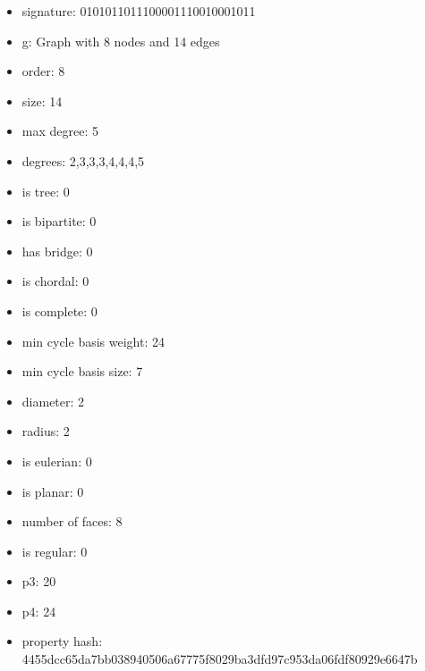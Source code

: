 \begin{itemize}
\item signature: 0101011011100001110010001011
\item g: Graph with 8 nodes and 14 edges
\item order: 8
\item size: 14
\item max degree: 5
\item degrees: 2,3,3,3,4,4,4,5
\item is tree: 0
\item is bipartite: 0
\item has bridge: 0
\item is chordal: 0
\item is complete: 0
\item min cycle basis weight: 24
\item min cycle basis size: 7
\item diameter: 2
\item radius: 2
\item is eulerian: 0
\item is planar: 0
\item number of faces: 8
\item is regular: 0
\item p3: 20
\item p4: 24
\item property hash: 4455dcc65da7bb038940506a67775f8029ba3dfd97c953da06fdf80929e6647b
\end{itemize}
\newpage
\begin{figure}
\end{figure}
